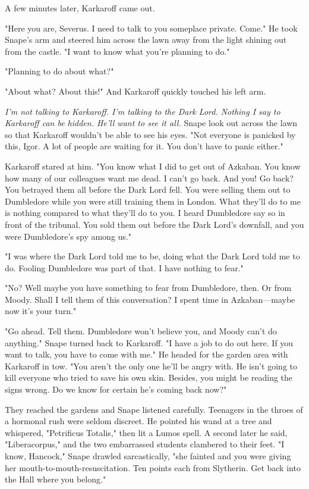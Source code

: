A few minutes later, Karkaroff came out.

"Here you are, Severus. I need to talk to you someplace private. Come." He took Snape's arm and steered him across the lawn away from the light shining out from the castle. "I want to know what you're planning to do."

"Planning to do about what?"

"About what? About this!" And Karkaroff quickly touched his left arm.

\emph{I'm not talking to Karkaroff. I'm talking to the Dark Lord. Nothing I say to Karkaroff can be hidden. He'll want to see it all.} Snape look out across the lawn so that Karkaroff wouldn't be able to see his eyes. "Not everyone is panicked by this, Igor. A lot of people are waiting for it. You don't have to panic either."

Karkaroff stared at him. "You know what I did to get out of Azkaban. You know how many of our colleagues want me dead. I can't go back. And you! Go back? You betrayed them all before the Dark Lord fell. You were selling them out to Dumbledore while you were still training them in London. What they'll do to me is nothing compared to what they'll do to you. I heard Dumbledore say so in front of the tribunal. You sold them out before the Dark Lord's downfall, and you were Dumbledore's spy among us."

"I was where the Dark Lord told me to be, doing what the Dark Lord told me to do. Fooling Dumbledore was part of that. I have nothing to fear."

"No? Well maybe you have something to fear from Dumbledore, then. Or from Moody. Shall I tell them of this conversation? I spent time in Azkaban—maybe now it's your turn."

"Go ahead. Tell them. Dumbledore won't believe you, and Moody can't do anything." Snape turned back to Karkaroff. "I have a job to do out here. If you want to talk, you have to come with me." He headed for the garden area with Karkaroff in tow. "You aren't the only one he'll be angry with. He isn't going to kill everyone who tried to save his own skin. Besides, you might be reading the signs wrong. Do we know for certain he's coming back now?"

They reached the gardens and Snape listened carefully. Teenagers in the throes of a hormonal rush were seldom discreet. He pointed his wand at a tree and whispered, "Petrificus Totalis," then lit a Lumos spell. A second later he said, "Liberacorpus," and the two embarrassed students clambered to their feet. "I know, Hancock," Snape drawled sarcastically, "she fainted and you were giving her mouth-to-mouth-resuscitation. Ten points each from Slytherin. Get back into the Hall where you belong."


